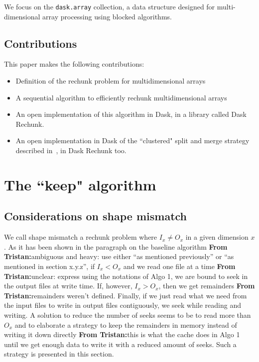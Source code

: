 \documentclass[conference]{IEEEtran}
\newcommand{\tristan}[1]{\color{orange}\textbf{From Tristan:}#1\color{black}}
\begin{document}
We focus on the \texttt{dask.array} collection, a data structure designed for
multi-dimensional array processing using blocked algorithms.

\subsection{Contributions}
This paper makes the following contributions:
\begin{itemize}
  \item Definition of the rechunk problem for multidimensional arrays
  \item A sequential algorithm to efficiently rechunk multidimensional arrays
  \item An open implementation of this algorithm in Dask, in a library called Dask Rechunk.
  \item An open implementation in Dask of the ``clustered" split and merge strategy described in~\cite{seqalgorithms}, in Dask Rechunk too.
\end{itemize}

\section{The ``keep" algorithm}

\subsection{Considerations on shape mismatch}
We call shape mismatch a rechunk problem where $I_x \neq O_x$ in a given dimension $x$. As it
has been shown in the paragraph on the baseline algorithm \tristan{ambiguous and heavy: use either ``as mentioned previously'' or ``as mentioned in section x.y.z''}, if $I_x < O_x$ and
we read one file at a time \tristan{unclear: express using the notations of Algo 1}, we are bound to seek in the output files at
write time. If, however, $I_x > O_x$, then we get remainders \tristan{remainders weren't defined}. Finally, if we
just read what we need from the input files to write in output files
contiguously, we seek while reading and writing. A solution to reduce the
number of seeks seems to be to read more than $O_x$ and to elaborate a strategy
to keep the remainders in memory instead of writing it down directly \tristan{this is what the cache does in Algo 1} until we
get enough data to write it with a reduced amount of seeks. Such a strategy is
presented in this section.
\end{document}
